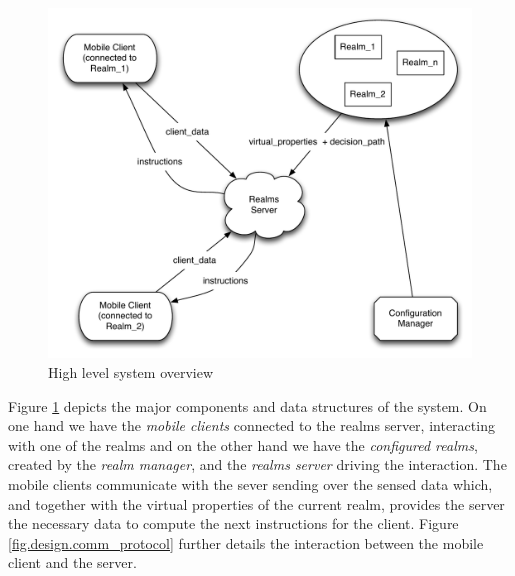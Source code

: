 \\\\
\begin{figure}
	\centering
	\includegraphics[width=0.9\linewidth]{fig/realms_high_lvl}
	\caption{High level system overview}
	\label{fig.design.high_lvl}
\end{figure}
Figure \ref{fig.design.high_lvl} depicts the major components and data structures of the system. On one hand we have the \emph{mobile clients} connected to the realms server, interacting with one of the realms and on the other hand we have the \emph{configured realms}, created by the \emph{realm manager}, and the \emph{realms server} driving the interaction. The mobile clients communicate with the sever sending over the sensed data which, and together with the virtual properties of the current realm, provides the server the necessary data to compute the next instructions for the client. Figure \ref{fig.design.comm_protocol} further details the interaction between the mobile client and the server.
\\\\
